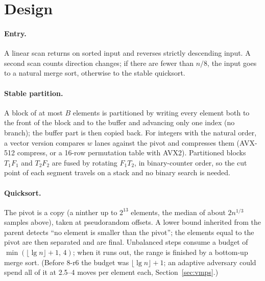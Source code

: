 \documentclass[10pt,a4paper]{article}
\begin{document}
\section{Design}
\paragraph{Entry.} A linear scan returns on sorted input and reverses strictly descending input.
A second scan counts direction changes; if there are fewer than $n/8$, the input goes to a
natural merge sort, otherwise to the stable quicksort.

\paragraph{Stable partition.} A block of at most $B$ elements is partitioned by writing every
element both to the front of the block and to the buffer and advancing only one index (no
branch); the buffer part is then copied back. For integers with the natural order, a vector
version compares $w$ lanes against the pivot and compresses them (AVX-512 compress, or a
16-row permutation table with AVX2). Partitioned blocks $T_1F_1$ and $T_2F_2$ are fused by
rotating $F_1T_2$, in binary-counter order, so the cut point of each segment travels on a stack
and no binary search is needed.

\paragraph{Quicksort.} The pivot is a copy (a ninther up to $2^{13}$ elements, the median of
about $2n^{1/3}$ samples above), taken at pseudorandom offsets. A lower bound inherited from the
parent detects ``no element is smaller than the pivot''; the elements equal to the pivot are then
separated and are final. Unbalanced steps consume a budget of $\min(\lfloor\lg n\rfloor+1,\,4)$;
when it runs out, the range is finished by a bottom-up merge sort. (Before 8-r6 the budget was
$\lfloor\lg n\rfloor+1$; an adaptive adversary could spend all of it at 2.5--4 moves per element
each, Section~\ref{sec:vmps}.)
\end{document}
